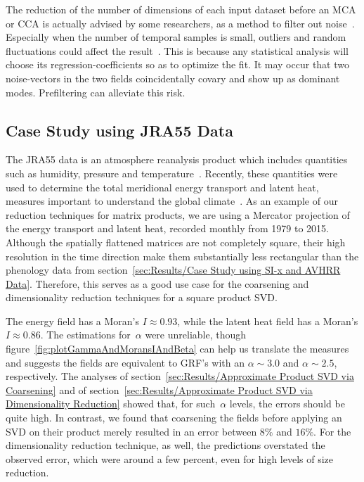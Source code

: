 \documentclass[ijgi,article,submit,moreauthors,pdftex,10pt,a4paper]{Definitions/mdpi}
\begin{document}
The reduction of the number of dimensions of each input dataset before an MCA or CCA is actually advised by some researchers, as a method to filter out noise~\cite{Barnett1987}. Especially when the number of temporal samples is small, outliers and random fluctuations could affect the result~\cite{Bretherton1992}. This is because any statistical analysis will choose its regression-coefficients so as to optimize the fit. It may occur that two noise-vectors in the two fields coincidentally covary and show up as dominant modes. Prefiltering can alleviate this risk.

\subsection{Case Study using JRA55 Data}
\label{sec:Results/Case Study using JRA55 Data}

The JRA55 data is an atmosphere reanalysis product which includes quantities such as humidity, pressure and temperature~\cite{Kobayashi2015}. Recently, these quantities were used to determine the total meridional energy transport and latent heat, measures important to understand the global climate~\cite{Liu2018}. As an example of our reduction techniques for matrix products, we are using a Mercator projection of the energy transport and latent heat, recorded monthly from 1979 to 2015. Although the spatially flattened matrices are not completely square, their high resolution in the time direction make them substantially less rectangular than the phenology data from section~\ref{sec:Results/Case Study using SI-x and AVHRR Data}. Therefore, this serves as a good use case for the coarsening and dimensionality reduction techniques for a square product SVD.

The energy field has a Moran's $I \approx 0.93$, while the latent heat field has a Moran's $I \approx 0.86$. The estimations for~$\alpha$ were unreliable, though figure~\ref{fig:plotGammaAndMoransIAndBeta} can help us translate the measures and suggests the fields are equivalent to GRF's with an $\alpha \sim 3.0$ and $\alpha \sim 2.5$, respectively. The analyses of section~\ref{sec:Results/Approximate Product SVD via Coarsening} and of section~\ref{sec:Results/Approximate Product SVD via Dimensionality Reduction} showed that, for such~$\alpha$ levels, the errors should be quite high. In contrast, we found that coarsening the fields before applying an SVD on their product merely resulted in an error between $8\%$ and $16\%$. For the dimensionality reduction technique, as well, the predictions overstated the observed error, which were around a few percent, even for high levels of size reduction. 
\end{document}
